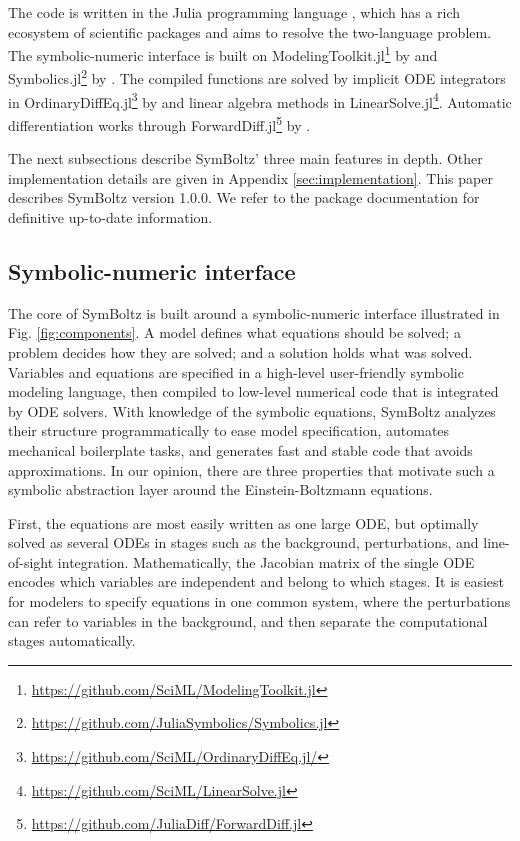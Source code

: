 \documentclass{aa}
\begin{document}
The code is written in the Julia programming language \citep{bezansonJuliaFreshApproach2017a}, which has a rich ecosystem of scientific packages and aims to resolve the two-language problem.
The symbolic-numeric interface is built on ModelingToolkit.jl\footnote{\url{https://github.com/SciML/ModelingToolkit.jl}} by \citet{maModelingToolkitComposableGraph2022} and Symbolics.jl\footnote{\url{https://github.com/JuliaSymbolics/Symbolics.jl}} by \citet{gowdaHighperformanceSymbolicnumericsMultiple2022}.
The compiled functions are solved by implicit ODE integrators in OrdinaryDiffEq.jl\footnote{\url{https://github.com/SciML/OrdinaryDiffEq.jl/}} by \citet{rackauckasDifferentialEquationsjlPerformantFeatureRich2017} and linear algebra methods in LinearSolve.jl\footnote{\url{https://github.com/SciML/LinearSolve.jl}}.
Automatic differentiation works through ForwardDiff.jl\footnote{\url{https://github.com/JuliaDiff/ForwardDiff.jl}} by \citet{revelsForwardModeAutomaticDifferentiation2016}.

The next subsections describe SymBoltz' three main features in depth.
Other implementation details are given in Appendix \ref{sec:implementation}.
This paper describes SymBoltz version 1.0.0.
We refer to the package documentation for definitive up-to-date information.

\subsection{Symbolic-numeric interface}
\label{sec:symbolicnumeric}

The core of SymBoltz is built around a symbolic-numeric interface illustrated in Fig. \ref{fig:components}.
A model defines what equations should be solved; a problem decides how they are solved; and a solution holds what was solved.
Variables and equations are specified in a high-level user-friendly symbolic modeling language, then compiled to low-level numerical code that is integrated by ODE solvers.
With knowledge of the symbolic equations, SymBoltz analyzes their structure programmatically to ease model specification, automates mechanical boilerplate tasks, and generates fast and stable code that avoids approximations.
In our opinion, there are three properties that motivate such a symbolic abstraction layer around the Einstein-Boltzmann equations.

First, the equations are most easily written as one large ODE, but optimally solved as several ODEs in stages such as the background, perturbations, and line-of-sight integration.
Mathematically, the Jacobian matrix of the single ODE encodes which variables are independent and belong to which stages.
It is easiest for modelers to specify equations in one common system, where the perturbations can refer to variables in the background, and then separate the computational stages automatically.
\end{document}
